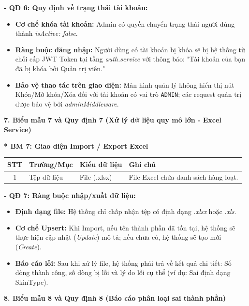 \documentclass[12pt,a4paper]{article}
\begin{document}
\textbf{- QĐ 6: Quy định về trạng thái tài khoản:}
\begin{itemize}
    \item \textbf{Cơ chế khóa tài khoản:} Admin có quyền chuyển trạng thái người dùng thành \textit{isActive: false}. 
    \item \textbf{Ràng buộc đăng nhập:} Người dùng có tài khoản bị khóa sẽ bị hệ thống từ chối cấp JWT Token tại tầng \textit{auth.service} với thông báo: "Tài khoản của bạn đã bị khóa bởi Quản trị viên."
    \item \textbf{Bảo vệ thao tác trên giao diện:} Màn hình quản lý không hiển thị nút Khóa/Mở khóa/Xóa đối với tài khoản có vai trò \texttt{ADMIN}; các request quản trị được bảo vệ bởi \textit{adminMiddleware}.
\end{itemize}

\vspace{0.5cm}
\textbf{7. Biểu mẫu 7 và Quy định 7 (Xử lý dữ liệu quy mô lớn - Excel Service)}

\textbf{* BM 7: Giao diện Import / Export Excel}
\begin{center}
\begin{tabular}{|c|p{3.5cm}|p{3.5cm}|p{5cm}|}
\hline
\textbf{STT} & \textbf{Trường/Mục} & \textbf{Kiểu dữ liệu} & \textbf{Ghi chú} \\
\hline
1 & Tệp dữ liệu & File (.xlsx) & File Excel chứa danh sách hàng loạt. \\
\hline
\end{tabular}
\end{center}

\textbf{- QĐ 7: Ràng buộc nhập/xuất dữ liệu:}
\begin{itemize}
    \item \textbf{Định dạng file:} Hệ thống chỉ chấp nhận tệp có định dạng \textit{.xlsx} hoặc \textit{.xls}.
    \item \textbf{Cơ chế Upsert:} Khi Import, nếu tên thành phần đã tồn tại, hệ thống sẽ thực hiện cập nhật (\textit{Update}) mô tả; nếu chưa có, hệ thống sẽ tạo mới (\textit{Create}).
    \item \textbf{Báo cáo lỗi:} Sau khi xử lý file, hệ thống phải trả về kết quả chi tiết: Số dòng thành công, số dòng bị lỗi và lý do lỗi cụ thể (ví dụ: Sai định dạng SkinType).
\end{itemize}

\vspace{0.5cm}
\textbf{8. Biểu mẫu 8 và Quy định 8 (Báo cáo phân loại sai thành phần)}
\end{document}
